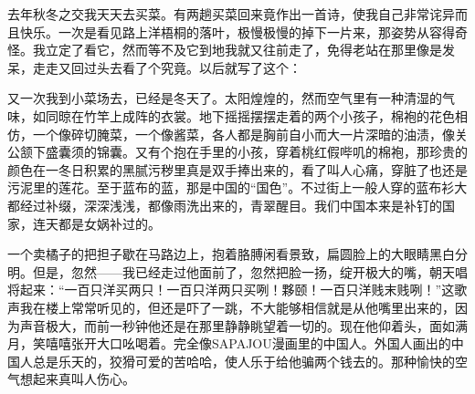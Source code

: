 \par 去年秋冬之交我天天去买菜。有两趟买菜回来竟作出一首诗，使我自己非常诧异而且快乐。一次是看见路上洋梧桐的落叶，极慢极慢的掉下一片来，那姿势从容得奇怪。我立定了看它，然而等不及它到地我就又往前走了，免得老站在那里像是发呆，走走又回过头去看了个究竟。以后就写了这个：
\par 又一次我到小菜场去，已经是冬天了。太阳煌煌的，然而空气里有一种清湿的气味，如同晾在竹竿上成阵的衣裳。地下摇摇摆摆走着的两个小孩子，棉袍的花色相仿，一个像碎切腌菜，一个像酱菜，各人都是胸前自小而大一片深暗的油渍，像关公颔下盛囊须的锦囊。又有个抱在手里的小孩，穿着桃红假哔叽的棉袍，那珍贵的颜色在一冬日积累的黑腻污秽里真是双手捧出来的，看了叫人心痛，穿脏了也还是污泥里的莲花。至于蓝布的蓝，那是中国的“国色”。不过街上一般人穿的蓝布衫大都经过补缀，深深浅浅，都像雨洗出来的，青翠醒目。我们中国本来是补钉的国家，连天都是女娲补过的。
\par 一个卖橘子的把担子歇在马路边上，抱着胳膊闲看景致，扁圆脸上的大眼睛黑白分明。但是，忽然——我已经走过他面前了，忽然把脸一扬，绽开极大的嘴，朝天唱将起来：“一百只洋买两只！一百只洋两只买咧！夥颐！一百只洋贱末贱咧！”这歌声我在楼上常常听见的，但还是吓了一跳，不大能够相信就是从他嘴里出来的，因为声音极大，而前一秒钟他还是在那里静静眺望着一切的。现在他仰着头，面如满月，笑嘻嘻张开大口吆喝着。完全像SAPAJOU漫画里的中国人。外国人画出的中国人总是乐天的，狡猾可爱的苦哈哈，使人乐于给他骗两个钱去的。那种愉快的空气想起来真叫人伤心。
